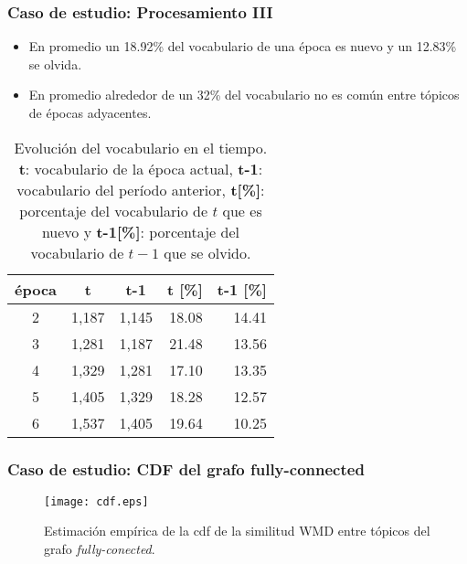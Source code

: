 \documentclass[
	spanish, %
	aspectratio=43, %
	hyperref={pdfencoding=auto,psdextra},
	xcolor={dvipsnames,table,usenames},
]{beamer}
\begin{document}
\begin{frame}[t]
\frametitle{Caso de estudio: Procesamiento III}
\begin{itemize}
  \item En promedio un 18.92\% del vocabulario de una época es nuevo y un 12.83\% se olvida.
  \item En promedio alrededor de un 32\% del vocabulario no es común entre tópicos de épocas adyacentes. 
\end{itemize}
\begin{table}[H]
\begin{tabular}{|c|r|r|r|r|}
\hline
\textbf{época} & \multicolumn{1}{c|}{\textbf{t}} & \multicolumn{1}{c|}{\textbf{t-1}} & \multicolumn{1}{c|}{\textbf{t {[}\%{]}}} & \multicolumn{1}{l|}{\textbf{t-1 {[}\%{]}}} \\ \hline
2     & 1,187                  & 1,145                    & 18.08                            & 14.41                              \\ \hline
3     & 1,281                  & 1,187                    & 21.48                            & 13.56                              \\ \hline
4     & 1,329                  & 1,281                    & 17.10                            & 13.35                              \\ \hline
5     & 1,405                  & 1,329                    & 18.28                            & 12.57                              \\ \hline
6     & 1,537                  & 1,405                    & 19.64                            & 10.25                              \\ \hline
\end{tabular}
\caption{Evolución del vocabulario en el tiempo. \textbf{t}: vocabulario de la época actual, \textbf{t-1}: vocabulario del período anterior, \textbf{t[\%]}: porcentaje del vocabulario de $t $ que es nuevo y\textbf{ t-1[\%]}: porcentaje del vocabulario de $t-1$ que se olvido.}
\end{table}


\end{frame}


\begin{frame}[t]
\frametitle{Caso de estudio: CDF del grafo fully-connected}

\begin{figure}
\texttt{[image: cdf.eps]}
\caption{Estimación empírica de la cdf de la similitud WMD entre tópicos del grafo \textit{fully-conected}.}
\label{img:cdf_wmd}
\end{figure}

\end{frame}
\end{document}
